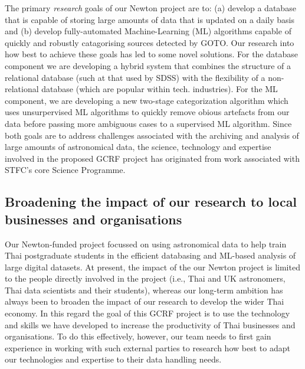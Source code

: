 \documentclass[11pt]{article}
\begin{document}
\vspace{2mm}
\noindent
The primary {\it research} goals of our Newton project are to: (a) develop a database that is capable of storing large amounts of data that is updated on a daily basis and (b) develop fully-automated Machine-Learning (ML) algorithms capable of quickly and robustly catagorising sources detected by GOTO. Our research into how best to achieve these goals has led to some novel solutions. For the database component we are developing a hybrid system that combines the structure of a relational database (such at that used by SDSS) with the flexibility of a non-relational database (which are popular within tech. industries). For the ML component, we are developing a new two-stage categorization algorithm which uses unsurpervised ML algorithms to quickly remove obious artefacts from our data before passing more ambiguous cases to a supervised ML algorithm. Since both goals are to address challenges associated with the archiving and analysis of large amounts of astronomical data, the science, technology and expertise involved in the proposed GCRF project has originated from work associated with STFC's core Science Programme. 

\subsection{Broadening the impact of our research to local businesses and organisations}
Our Newton-funded project focussed on using astronomical data to help train Thai postgraduate students in the efficient databasing and ML-based analysis of large digital datasets. At present, the impact of the our Newton project is limited to the people directly involved in the project (i.e., Thai and UK astronomers, Thai data scientists and their students), whereas our long-term ambition has always been to broaden the impact of our research to develop the wider Thai economy. In this regard the goal of this GCRF project is to use the technology and skills we have developed to increase the productivity of Thai businesses and organisations. To do this effectively, however, our team needs to first gain experience in working with such external parties to research how best to adapt our technologies and expertise to their data handling needs.  
\end{document}
